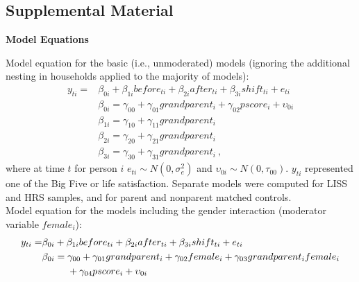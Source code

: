 \documentclass[
  english,
  man, noextraspace]{apa7}
\begin{document}
\begin{appendix}
\renewcommand{\appendixname}{\textcolor{white}{.}}

\hypertarget{supplemental-material}{%
\section{Supplemental Material}\label{supplemental-material}}

\renewcommand{\thefigure}{S\arabic{figure}} \setcounter{figure}{0}
\renewcommand{\thetable}{S\arabic{table}} \setcounter{table}{0}

\setcounter{page}{1}

\noindent \textbf{Model Equations}

Model equation for the basic (i.e., unmoderated) models (ignoring the
additional nesting in households applied to the majority of models):
\begin{equation}
\begin{split}
y_{ti} =& \beta_{0i} + \beta_{1i}before_{ti} + \beta_{2i}after_{ti} + \beta_{3i}shift_{ti} + e_{ti} \\
& \beta_{0i} = \gamma_{00} + \gamma_{01}grandparent_i + \gamma_{02}pscore_i + \upsilon_{0i} \\
& \beta_{1i} = \gamma_{10} + \gamma_{11}grandparent_i \\
& \beta_{2i} = \gamma_{20} + \gamma_{21}grandparent_i \\
& \beta_{3i} = \gamma_{30} + \gamma_{31}grandparent_i\ ,
\end{split}
\label{eq:mlm1}
\end{equation} where at time \(t\) for person \(i\)
\(e_{ti} \sim N(0, \sigma_e^2)\) and
\(\upsilon_{0i} \sim N(0, \tau_{00})\). \(y_{ti}\) represented one of
the Big Five or life satisfaction. Separate models were computed for
LISS and HRS samples, and for parent and nonparent matched controls.\\
Model equation for the models including the gender interaction
(moderator variable \(female_i\)): \begin{equation}
\begin{split}
y_{ti} =& \beta_{0i} + \beta_{1i}before_{ti} + \beta_{2i}after_{ti} + \beta_{3i}shift_{ti} + e_{ti} \\
& \beta_{0i} = \gamma_{00} + \gamma_{01}grandparent_i + \gamma_{02}female_i + \gamma_{03}grandparent_{i}female_{i} \\
& \hphantom{{}=\beta_{0i}}+ \gamma_{04}pscore_i + \upsilon_{0i} \\

\end{split}
\end{equation}
\end{appendix}
\end{document}
